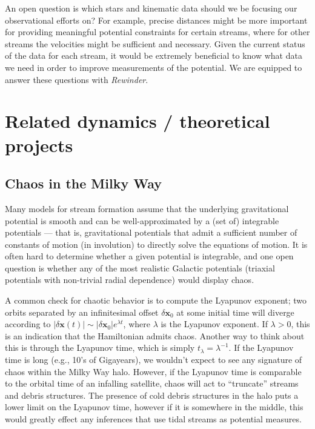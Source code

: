 \documentclass[letterpaper,12pt,preprint]{aastex}
\newcommand{\rewinder}{\emph{Rewinder}}
\begin{document}
An open question is which stars and kinematic data should we be focusing our observational efforts on? For example, precise distances might be more important for providing meaningful potential constraints for certain streams, where for other streams the velocities might be sufficient and necessary. Given the current status of the data for each stream, it would be extremely beneficial to know what data we need in order to improve measurements of the potential. We are equipped to answer these questions with \rewinder.

\section{Related dynamics / theoretical projects}
\subsection{Chaos in the Milky Way}
Many models for stream formation assume that the underlying gravitational potential is smooth and can be well-approximated by a (set of) integrable potentials --- that is, gravitational potentials that admit a sufficient number of constants of motion (in involution) to directly solve the equations of motion. It is often hard to determine whether a given potential is integrable, and one open question is whether any of the most realistic Galactic potentials (triaxial potentials with non-trivial radial dependence) would display chaos. 

A common check for chaotic behavior is to compute the Lyapunov exponent; two orbits separated by an infinitesimal offset $\delta \boldsymbol{x}_0$ at some initial time will diverge according to $\vert\delta \boldsymbol{x}(t)\vert \sim \vert\delta\boldsymbol{x}_0\vert e^{\lambda t}$, where $\lambda$ is the Lyapunov exponent. If $\lambda > 0$, this is an indication that the Hamiltonian admits chaos. Another way to think about this is through the Lyapunov time, which is simply $t_\lambda = \lambda^{-1}$. If the Lyapunov time is long (e.g., 10's of Gigayears), we wouldn't expect to see any signature of chaos within the Milky Way halo. However, if the Lyapunov time is comparable to the orbital time of an infalling satellite, chaos will act to ``truncate'' streams and debris structures. The presence of cold debris structures in the halo puts a lower limit on the Lyapunov time, however if it is somewhere in the middle, this would greatly effect any inferences that use tidal streams as potential measures.
\end{document}
